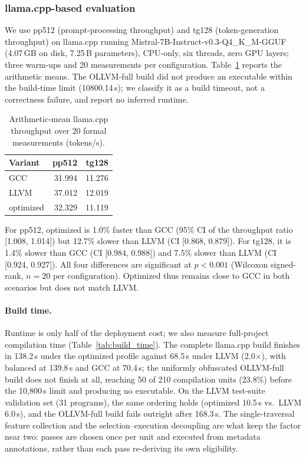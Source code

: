 \documentclass[pdflatex,sn-mathphys-num]{sn-jnl}
\theoremstyle{thmstyleone}%
\theoremstyle{thmstyletwo}%
\theoremstyle{thmstylethree}%
\begin{document}
\subsubsection{llama.cpp-based evaluation}
We use pp512 (prompt-processing throughput) and tg128 (token-generation throughput) on
llama.cpp running Mistral-7B-Instruct-v0.3-Q4\_K\_M-GGUF (4.07\,GB on disk, 7.25\,B
parameters), CPU-only, six threads, zero GPU layers;
three warm-ups and 20 measurements per configuration. Table~\ref{tab:llama_means}
reports the arithmetic means. The
OLLVM-full build did not produce an executable within the build-time limit
(10800.14\,s); we classify it as a build timeout, not a correctness failure, and
report no inferred runtime.

\begin{table}[!t]
\centering
\footnotesize
\caption{Arithmetic-mean llama.cpp throughput over 20 formal measurements (tokens/s).}
\label{tab:llama_means}
\begin{tabular}{lrr}
\toprule
Variant & pp512 & tg128 \\
\midrule
GCC & 31.994 & 11.276 \\
LLVM & 37.012 & 12.019 \\
optimized & 32.329 & 11.119 \\
\bottomrule
\end{tabular}
\end{table}

For pp512, optimized is 1.0\% faster than GCC (95\% CI of the throughput ratio
[1.008, 1.014]) but 12.7\% slower than LLVM (CI [0.868, 0.879]). For tg128,
it is 1.4\% slower than GCC (CI [0.984, 0.988]) and 7.5\% slower than LLVM (CI
[0.924, 0.927]). All four differences are significant at $p<0.001$ (Wilcoxon
signed-rank, $n=20$ per configuration). Optimized thus remains close
to GCC in both scenarios but does not match LLVM.

\paragraph{Build time.}
Runtime is only half of the deployment cost; we also measure
full-project compilation time (Table~\ref{tab:build_time}). The complete llama.cpp
build finishes in 138.2\,s under the optimized profile against 68.5\,s under LLVM
(2.0$\times$), with balanced at 139.8\,s and GCC at 70.4\,s; the uniformly obfuscated
OLLVM-full build does not finish at all, reaching 50 of 210 compilation units (23.8\%)
before the 10{,}800\,s limit and producing no executable. On the LLVM test-suite
validation set (31 programs), the same ordering holds (optimized 10.5\,s vs.\ LLVM
6.0\,s), and the OLLVM-full build fails outright after 168.3\,s. The single-traversal
feature collection and the selection--execution decoupling are what
keep the factor near two: passes are chosen once per unit and executed from metadata
annotations, rather than each pass re-deriving its own eligibility.
\end{document}
